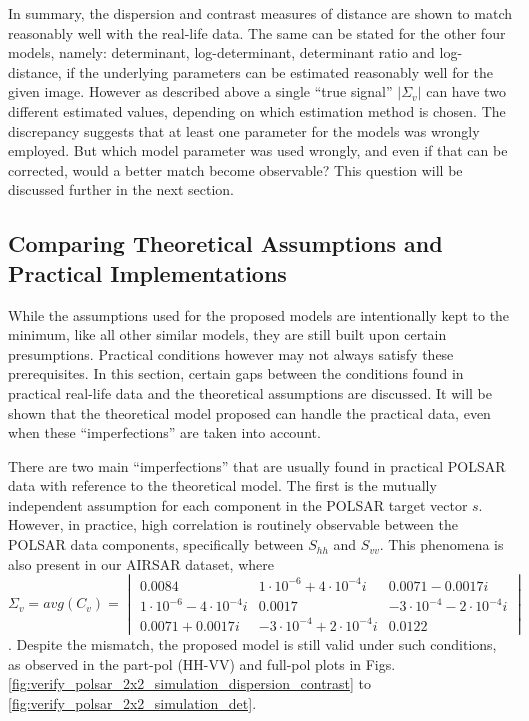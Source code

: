 In summary, the dispersion and contrast measures of distance are shown to match reasonably well with the real-life data. 
The same can be stated for the other four models, namely: determinant, log-determinant, determinant ratio and log-distance,
  if the underlying parameters can be estimated reasonably well for the given image.   
However as described above a single ``true signal'' $|\Sigma_v|$ can have two different estimated values,
  depending on which estimation method is chosen.
The discrepancy suggests that at least one parameter for the models was wrongly employed.
But which model parameter was used wrongly, and even if that can be corrected, would
a better match become observable? This question will be discussed further in the next section.

\subsection{Comparing Theoretical Assumptions and Practical Implementations}
\label{sec:improve_the_match_bw_theory_practice}

While the assumptions used for the proposed models are intentionally kept to the minimum, 
  like all other similar models, they are still built upon certain presumptions.
Practical conditions however may not always satisfy these prerequisites.
In this section, certain gaps between the conditions found in practical real-life data and the theoretical assumptions are discussed.
It will be shown that the theoretical model proposed can handle the practical data, even when these ``imperfections''  are taken into account.

There are two main ``imperfections'' that are usually found in practical POLSAR data with reference to the theoretical model.
The first is the mutually independent assumption for each component in the POLSAR target vector $s$.
However, in practice, high correlation is routinely observable between the POLSAR data components,
  specifically between $S_{hh}$ and $S_{vv}$.
This phenomena is also present in our AIRSAR dataset, where
${\Sigma_v = avg(C_v) = \begin{vmatrix} 0.0084 & 1 \cdot 10^{-6} + 4 \cdot 10^{-4} i & 0.0071 - 0.0017 i \\ 1 \cdot 10^{-6} - 4 \cdot 10^{-4} i & 0.0017 & -3 \cdot 10^{-4} - 2 \cdot 10^{-4} i \\ 0.0071 + 0.0017 i & -3 \cdot 10^{-4} + 2 \cdot 10^{-4} i & 0.0122 \end{vmatrix}}$.
Despite the mismatch, the proposed model  is still valid under such conditions, as observed in the part-pol (HH-VV) and full-pol
plots in Figs. \ref{fig:verify_polsar_2x2_simulation_dispersion_contrast} to \ref{fig:verify_polsar_2x2_simulation_det}.

